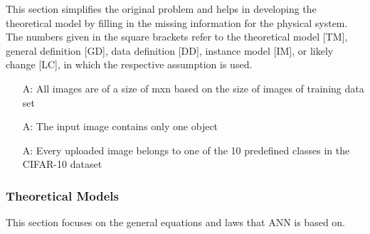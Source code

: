 \documentclass[12pt]{article}
\newcounter{assumpnum} %
\begin{document}
This section simplifies the original problem and helps in developing the
theoretical model by filling in the missing information for the physical system.
The numbers given in the square brackets refer to the theoretical model [TM],
general definition [GD], data definition [DD], instance model [IM], or likely
change [LC], in which the respective assumption is used.

\begin{itemize}

\item[A\refstepcounter{assumpnum}\theassumpnum \label{size}:]
All images are of a size of mxn based on the size of images of training data set
\item[A\refstepcounter{assumpnum}\theassumpnum \label{object}:]
 The input image contains only one object
 \item[A\refstepcounter{assumpnum}\theassumpnum \label{class}:]
 Every uploaded image belongs to one of the 10 predefined classes in the CIFAR-10 dataset \cite{CIFAR}

\end{itemize}

\subsubsection{Theoretical Models}\label{sec_theoretical}



This section focuses on the general equations and laws that ANN is based
on.  
\end{document}
